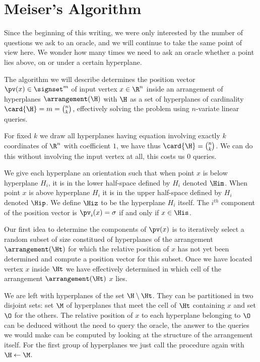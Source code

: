 \section{Meiser's Algorithm}


Since the beginning of this writing, we were only interested by the number of
questions we ask to an oracle, and we will continue to take the same point of
view here. We wonder how many times we need to ask an oracle whether a point
lies above, on or under a certain hyperplane.

The algorithm we will describe determines the position vector $\pv(x) \in
\signset^{m}$ of input vertex $x \in \R^n$ inside an
arrangement of hyperplanes $\arrangement(\H)$ with $\H$ as a set of hyperplanes
of cardinality $\card{\H} = m = \binom{n}{k}$,
effectively solving the \kSUM problem using  $n$-variate
linear queries.

For fixed $k$ we draw all hyperplanes having equation involving exactly $k$
coordinates of $\R^n$ with coefficient $1$, we have thus $\card{\H} =
\binom{n}{k}$. We can do this without involving the input vertex at all, this
costs us $0$ queries.

We give each hyperplane an orientation such that when point $x$ is below
hyperplane $H_i$, it is in the lower half-space defined by $H_i$ denoted
$\Him$. When point $x$ is above hyperplane $H_i$ it is in the upper
half-space defined by $H_i$ denoted $\Hip$. We define $\Hiz$ to be the
hyperplane $H_i$ itself. The $i^{th}$ component of the position vector is
$\pv_i(x) = \sigma$ if and only if $x \in \His$.

Our first idea to determine the components of $\pv(x)$ is to iteratively
select a random subset of size  constitued of hyperplanes of the
arrangement $\arrangement(\Ht)$ for which the relative position of $x$ has not yet been
determined and compute a position vector for this subset. Once we have located
vertex $x$ inside $\Ht$ we have effectively determined in
which cell of the arrangement $\arrangement(\Ht)$ $x$ lies.

We are left with hyperplanes of the set $\H \setminus \Ht$. They can be
partitioned in two disjoint sets: set $\M$ of hyperplanes that meet the cell of
$\Ht$ containing $x$ and set $\O$ for the others. The relative position of $x$
to each hyperplane belonging to $\O$ can be deduced without the need to query
the oracle, the answer to the queries we would make can be computed by looking
at the structure of the arrangement itself. For the first group of hyperplanes
we just call the procedure again with $\H \gets \M$.

